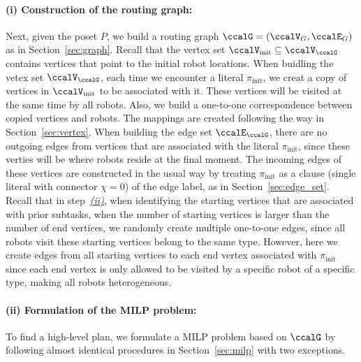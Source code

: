 \documentclass[Afour,sageh,times]{sagej}
\begin{document}
{{{  \paragraph{(i) Construction of the routing graph:}   Next, given the poset $P$, we build a routing graph $\ccalG = (\ccalV_G, \ccalE_G)$ as in Section~\ref{sec:graph}. Recall that the vertex set $\ccalV_\text{init} \subseteq \ccalV_\ccalG$ contains vertices that point to the initial robot locations. When buidling the vetex set $\ccalV_\ccalG$, each time we encounter a literal $\pi_{\text{init}}$, we creat a copy of vertices in $\ccalV_{\text{init}}$ to be associated with it. These vertices will be visited at the same time by all robots.  Also, we build a one-to-one correspondence between copied vertices and robots. The mappings are created following the way in Section~\ref{sec:vertex}.  When  building the edge set $\ccalE_\ccalG$, there are no outgoing edges from  vertices that are associated with the literal $\pi_\text{init}$, since these verties will be where robots reside at the final moment. The incoming edges of these vertices are constructed in the usual way by treating $\pi_{\text{init}}$ as a clause (single literal with connector $\chi=0$) of the edge label, as in Section~\ref{sec:edge_set}. Recall that in step~\hyperref[sec:a]{\it {(ii)}}, when identifying the starting vertices that are associated with prior subtasks,  when the number of starting vertices is larger than the number of end vertices, we randomly create multiple  one-to-one edges, since all robots visit these starting vertices belong to the same type. However, here we create edges from all starting vertices to each end vertex associated with $\pi_{\text{init}}$ since each end vertex is only allowed to be visited by a specific robot of a specific type, making all robots heterogeneous.

 \paragraph{(ii) Formulation of the MILP problem:}  To find a high-level plan, we formulate a MILP problem based on $\ccalG$ by following almost identical procedures in Section~\ref{sec:milp} with two exceptions.

}}}
\end{document}
